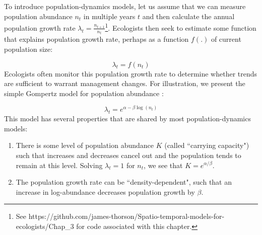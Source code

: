 To introduce population-dynamics models, let us assume that we can measure population abundance \(n_t\) in multiple years \(t\) and then calculate the annual population growth rate \( \lambda_t = \frac{n_{t+1}}{n_t} \)\footnote{See https://github.com/james-thorson/Spatio-temporal-models-for-ecologists/Chap\_3 for code associated with this chapter.}.  Ecologists then seek to estimate some function that explains population growth rate, perhaps as a function \(f(.)\) of current population size:

\begin{equation} \label{eq:Chap3_population_dynamics}
    \lambda_t = f(n_{t})    
\end{equation} 
Ecologists often monitor this population growth rate to determine whether trends are sufficient to warrant management changes.  For illustration, we present the simple Gompertz model for population abundance \cite{dennis_estimating_2006}:

\begin{equation} \label{eq:Chap3_Gompertz}
    \lambda_t = e^{\alpha - \beta \log(n_{t})}    
\end{equation} 
This model has several properties that are shared by most population-dynamics models:

\begin{enumerate}
    \item There is some level of population abundance \(K\) (called ``carrying capacity") such that increases and decreases cancel out and the population tends to remain at this level.  Solving \(\lambda_t=1\) for \(n_t\), we see that \( K = e^{\alpha / \beta} \).

    \item The population growth rate can be ``density-dependent", such that an increase in log-abundance decreases population growth by \(\beta\).  
\end{enumerate}

